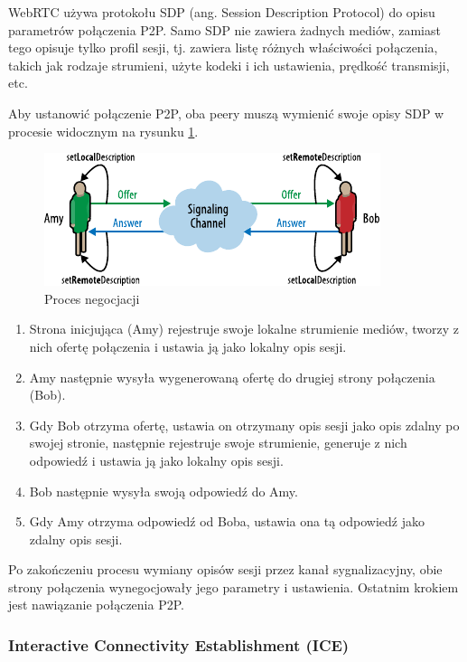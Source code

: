 WebRTC używa protokołu SDP (ang. Session Description Protocol) do opisu parametrów połączenia P2P.
Samo SDP nie zawiera żadnych mediów, zamiast tego opisuje tylko profil sesji, tj. zawiera listę
różnych właściwości połączenia, takich jak rodzaje strumieni, użyte kodeki i ich ustawienia,
prędkość transmisji, etc.

Aby ustanowić połączenie P2P, oba peery muszą wymienić swoje opisy SDP w procesie widocznym na
rysunku \ref{fig:signaling2}.

\begin{figure}[H]
    \centering
    \includegraphics{img/signaling-2}
    \caption{Proces negocjacji}
    \label{fig:signaling2}
\end{figure}

\begin{enumerate}
    \item Strona inicjująca (Amy) rejestruje swoje lokalne strumienie mediów, tworzy z nich ofertę
          połączenia i ustawia ją jako lokalny opis sesji.
    \item Amy następnie wysyła wygenerowaną ofertę do drugiej strony połączenia (Bob).
    \item Gdy Bob otrzyma ofertę, ustawia on otrzymany opis sesji jako opis zdalny po swojej
          stronie, następnie rejestruje swoje strumienie, generuje z nich odpowiedź i ustawia ją jako
          lokalny opis sesji.
    \item Bob następnie wysyła swoją odpowiedź do Amy.
    \item Gdy Amy otrzyma odpowiedź od Boba, ustawia ona tą odpowiedź jako zdalny opis sesji.
\end{enumerate}

Po zakończeniu procesu wymiany opisów sesji przez kanał sygnalizacyjny, obie strony połączenia
wynegocjowały jego parametry i ustawienia. Ostatnim krokiem jest nawiązanie połączenia P2P.

\subsubsection{Interactive Connectivity Establishment (ICE)}
\label{ice}

